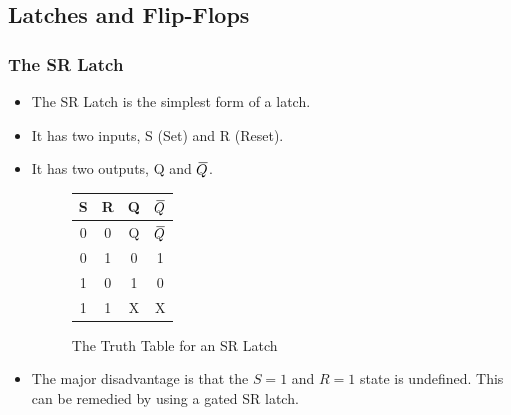 \documentclass[12pt]{article}
\newcommand{\closure}[2][3]{%
	{}\mkern#1mu\overline{\mkern-#1mu#2}}
\begin{document}
\subsection{Latches and Flip-Flops}
\subsubsection{The SR Latch}
\begin{itemize}
	\item The SR Latch is the simplest form of a latch.
	\item It has two inputs, S (Set) and R (Reset).
	\item It has two outputs, Q and \(\closure{Q}\).
	      \begin{figure}[H]
		      \centering
		      \begin{tabular}{|c|c|c|c|}
			      \hline
			      S & R & Q & \(\closure{Q}\) \\
			      \hline
			      0 & 0 & Q & \(\closure{Q}\) \\
			      0 & 1 & 0 & 1               \\
			      1 & 0 & 1 & 0               \\
			      1 & 1 & X & X               \\
			      \hline
		      \end{tabular}
		      \caption{The Truth Table for an SR Latch}
	      \end{figure}
	\item The major disadvantage is that the \(S = 1\) and \(R = 1\) state is
	      undefined. This can be remedied by using a gated SR latch.

\end{itemize}
\end{document}
